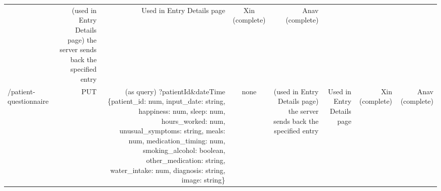 \documentclass[]{book}
\begin{document}
\begin{longtable}[]{@{}lrrcrrrr@{}}
\begin{minipage}[t]{0.14\columnwidth}
\end{minipage} & \begin{minipage}[t]{0.06\columnwidth}\raggedleft\strut
(used in Entry Details page) the server sends back the specified
entry\strut
\end{minipage} & \begin{minipage}[t]{0.06\columnwidth}\raggedleft\strut
Used in Entry Details page\strut
\end{minipage} & \begin{minipage}[t]{0.06\columnwidth}\raggedleft\strut
Xin (complete)\strut
\end{minipage} & \begin{minipage}[t]{0.06\columnwidth}\raggedleft\strut
Anav (complete)\strut
\end{minipage}\tabularnewline
\begin{minipage}[t]{0.12\columnwidth}\raggedright\strut
/patient-questionnaire\strut
\end{minipage} & \begin{minipage}[t]{0.13\columnwidth}\raggedleft\strut
PUT\strut
\end{minipage} & \begin{minipage}[t]{0.13\columnwidth}\raggedleft\strut
(as query) ?patientId\&dateTime \{patient\_id: num, input\_date: string,
happiness: num, sleep: num, hours\_worked: num, unusual\_symptoms:
string, meals: num, medication\_timing: num, smoking\_alcohol: boolean,
other\_medication: string, water\_intake: num, diagnosis: string, image:
string\}\strut
\end{minipage} & \begin{minipage}[t]{0.14\columnwidth}\centering\strut
none\strut
\end{minipage} & \begin{minipage}[t]{0.06\columnwidth}\raggedleft\strut
(used in Entry Details page) the server sends back the specified
entry\strut
\end{minipage} & \begin{minipage}[t]{0.06\columnwidth}\raggedleft\strut
Used in Entry Details page\strut
\end{minipage} & \begin{minipage}[t]{0.06\columnwidth}\raggedleft\strut
Xin (complete)\strut
\end{minipage} & \begin{minipage}[t]{0.06\columnwidth}\raggedleft\strut
Anav (complete)\strut
\end{minipage}\tabularnewline
\bottomrule
\end{longtable}
\end{document}
